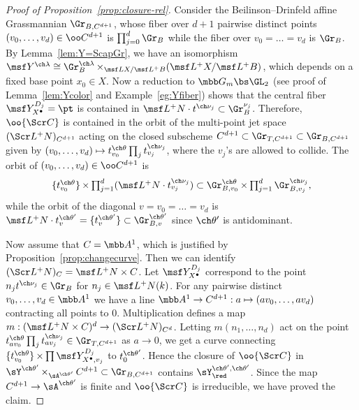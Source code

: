 \documentclass[final]{amsart}
\theoremstyle{remark}
\theoremstyle{definition}
\DeclareMathOperator*{\xt}{\times}
\numberwithin{equation}{section}
\begin{document}
\begin{proof}[{Proof of Proposition~\ref{prop:closure-rel}}]
\smallskip

Consider the Beilinson--Drinfeld affine Grassmannian $\Gr_{B,C^{d+1}}$, 
whose fiber over $d+1$ pairwise distinct points $(v_0,\dotsc, v_d)\in \oo C^{d+1}$ 
is $\prod_{j=0}^d \Gr_B$ while the fiber over $v_0=\dotsc=v_d$ is $\Gr_B$. 
By Lemma~\ref{lem:Y=ScapGr}, we have an isomorphism $\msf Y^{\ch\lambda}\cong \Gr_B^{\ch\lambda}
\xt_{\msf L X/\msf L^+B}(\msf L^+X/\msf L^+B)$,
which depends on a fixed base point $x_0 \in X$. 
Now a reduction to $\mbb G_m \bs \GL_2$ (see proof of Lemma~\ref{lem:Ycolor}
and Example~\ref{eg:Yfiber})
shows that the central fiber $\msf Y^{D_j}_{X^\bullet} = \pt$ is contained in 
$\msf L^+ N \cdot t^{\ch\nu_j} \subset \Gr_B^{\nu_j}$.
Therefore, $\oo{\Scr C}$ is contained in 
the orbit of the multi-point jet space $(\Scr L^+N)_{C^{d+1}}$ acting on 
the closed subscheme $C^{d+1}\subset \Gr_{T, C^{d+1}}\subset \Gr_{B,C^{d+1}}$
given by $(v_0,\dotsc, v_d) \mapsto t_{v_0}^{\ch\theta} \prod_j t_{v_j}^{\ch\nu_j}$, where
the $v_j$'s are allowed to collide. 
The orbit of $(v_0,\dotsc, v_d) \in \oo C^{d+1}$ is 
\[ \textstyle
\{t_{v_0}^{\ch\theta}\} \xt \prod_{j=1}^d (\msf L^+ N \cdot t^{\ch\nu_j}_{v_j}) 
\subset \Gr_{B,v_0}^{\ch\theta} \xt \prod_{j=1}^d \Gr_{B,v_j}^{\ch\nu_j},
\]
while the orbit of the diagonal $v=v_0=\dotsc=v_d$ 
is $\msf L^+ N \cdot t^{\ch\theta'}_v = \{ t^{\ch\theta'}_v \} \subset \Gr_{B,v}^{\ch\theta'}$
since $\ch\theta'$ is antidominant. 

Now assume that $C=\mbb A^1$, which is justified by Proposition~\ref{prop:changecurve}.
Then we can identify $(\Scr L^+ N)_C = \msf L^+ N \times C$. 
Let $\msf Y^{D_j}_{X^\bullet}$ correspond to the point $n_j t^{\ch\nu_j}\in \Gr_B$
for $n_j \in \msf L^+N(k)$. 
For any pairwise distinct $v_0,\dotsc, v_d \in \mbb A^1$ we have
a line $\mbb A^1 \to C^{d+1} : a \mapsto (a v_0, \dotsc, a v_d)$ contracting all points to $0$. 
Multiplication defines a map 
$m: (\msf L^+ N \times C)^d \to (\Scr L^+ N)_{C^d}$. 
Letting $m(n_1,\dotsc,n_d)$ act 
on the point $t_{a v_0}^{\ch\theta} \prod_j t_{a v_j}^{\ch\nu_j} 
\in \Gr_{T,C^{d+1}}$ as $a\to 0$, 
we get a curve connecting $\{ t^{\ch\theta}_{v_0} \} \xt \prod \msf Y^{D_j}_{X^\bullet,v_j}$ to 
$t^{\ch\theta'}_0$. 
Hence the closure of $\oo{\Scr C}$ 
in $\sY^{\ch\theta'} \xt_{\sA^{\ch\theta'}} C^{d+1} \subset \Gr_{B,C^{d+1}}$ contains $\sY^{\ch\theta',\ch\theta'}_\red$.
Since the map $C^{d+1} \to \sA^{\ch\theta'}$ is finite and $\oo{\Scr C}$ is irreducible,
we have proved the claim.
\end{proof}
\end{document}
